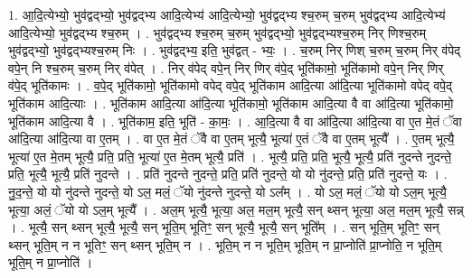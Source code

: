 \documentclass[17pt]{extarticle}
\begin{document}
1. आ॒दि॒त्येभ्यो॒ भुव॑द्वद्भ्यो॒ भुव॑द्वद्भ्य आदि॒त्येभ्य॑ आदि॒त्येभ्यो॒ भुव॑द्वद्भ्य श्च॒रुम् च॒रुम् भुव॑द्वद्भ्य आदि॒त्येभ्य॑ आदि॒त्येभ्यो॒ भुव॑द्वद्भ्य श्च॒रुम् । . भुव॑द्वद्भ्य श्च॒रुम् च॒रुम् भुव॑द्वद्भ्यो॒ भुव॑द्वद्भ्यश्च॒रुम् निर् णिश्च॒रुम् भुव॑द्वद्भ्यो॒ भुव॑द्वद्भ्यश्च॒रुम् निः । . भुव॑द्वद्भ्य॒ इति॒ भुव॑द्वत् - भ्यः॒ । . च॒रुम् निर् णिश् च॒रुम् च॒रुम् निर् व॑पेद् वपे॒न् नि श्च॒रुम् च॒रुम् निर् व॑पेत् । . निर् व॑पेद् वपे॒न् निर् णिर् व॑पे॒द् भूति॑कामो॒ भूति॑कामो वपे॒न् निर् णिर् व॑पे॒द् भूति॑कामः । . व॒पे॒द् भूति॑कामो॒ भूति॑कामो वपेद् वपे॒द् भूति॑काम आदि॒त्या आ॑दि॒त्या भूति॑कामो वपेद् वपे॒द् भूति॑काम आदि॒त्याः । . भूति॑काम आदि॒त्या आ॑दि॒त्या भूति॑कामो॒ भूति॑काम आदि॒त्या वै वा आ॑दि॒त्या भूति॑कामो॒ भूति॑काम आदि॒त्या वै । . भूति॑काम॒ इति॒ भूति॑ - का॒मः॒ । . आ॒दि॒त्या वै वा आ॑दि॒त्या आ॑दि॒त्या वा ए॒त मे॒तं ॅवा आ॑दि॒त्या आ॑दि॒त्या वा ए॒तम् । . वा ए॒त मे॒तं ॅवै वा ए॒तम् भूत्यै॒ भूत्या॑ ए॒तं ॅवै वा ए॒तम् भूत्यै᳚ । . ए॒तम् भूत्यै॒ भूत्या॑ ए॒त मे॒तम् भूत्यै॒ प्रति॒ प्रति॒ भूत्या॑ ए॒त मे॒तम् भूत्यै॒ प्रति॑ । . भूत्यै॒ प्रति॒ प्रति॒ भूत्यै॒ भूत्यै॒ प्रति॑ नुदन्ते नुदन्ते॒ प्रति॒ भूत्यै॒ भूत्यै॒ प्रति॑ नुदन्ते । . प्रति॑ नुदन्ते नुदन्ते॒ प्रति॒ प्रति॑ नुदन्ते॒ यो यो नु॑दन्ते॒ प्रति॒ प्रति॑ नुदन्ते॒ यः । . नु॒द॒न्ते॒ यो यो नु॑दन्ते नुदन्ते॒ यो ऽल॒ मलं॒ ॅयो नु॑दन्ते नुदन्ते॒ यो ऽल᳚म् । . यो ऽल॒ मलं॒ ॅयो यो ऽल॒म् भूत्यै॒ भूत्या॒ अलं॒ ॅयो यो ऽल॒म् भूत्यै᳚ । . अल॒म् भूत्यै॒ भूत्या॒ अल॒ मल॒म् भूत्यै॒ सन् थ्सन् भूत्या॒ अल॒ मल॒म् भूत्यै॒ सन्न् । . भूत्यै॒ सन् थ्सन् भूत्यै॒ भूत्यै॒ सन् भूति॒म् भूतिꣳ॒॒ सन् भूत्यै॒ भूत्यै॒ सन् भूति᳚म् । . सन् भूति॒म् भूतिꣳ॒॒ सन् थ्सन् भूति॒म् न न भूतिꣳ॒॒ सन् थ्सन् भूति॒म् न । . भूति॒म् न न भूति॒म् भूति॒म् न प्रा॒प्नोति॑ प्रा॒प्नोति॒ न भूति॒म् भूति॒म् न प्रा॒प्नोति॑ । \newline
\end{document}

